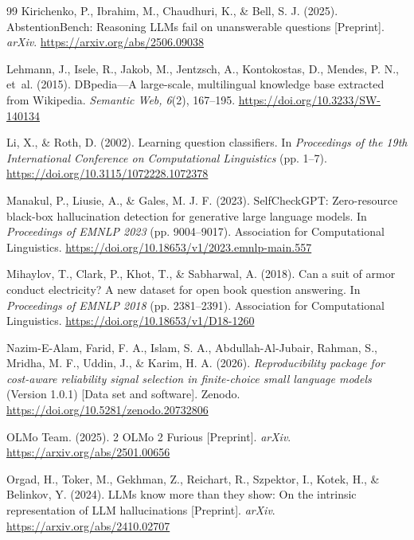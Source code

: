 \documentclass[preprint,12pt,authoryear]{elsarticle}
\begin{document}
\begin{thebibliography}{99}
Kirichenko, P., Ibrahim, M., Chaudhuri, K., \& Bell, S. J. (2025). AbstentionBench: Reasoning LLMs fail on unanswerable questions [Preprint]. \emph{arXiv}. \url{https://arxiv.org/abs/2506.09038}

Lehmann, J., Isele, R., Jakob, M., Jentzsch, A., Kontokostas, D., Mendes, P. N., et~al. (2015). DBpedia---A large-scale, multilingual knowledge base extracted from Wikipedia. \emph{Semantic Web, 6}(2), 167--195. \url{https://doi.org/10.3233/SW-140134}

Li, X., \& Roth, D. (2002). Learning question classifiers. In \emph{Proceedings of the 19th International Conference on Computational Linguistics} (pp. 1--7). \url{https://doi.org/10.3115/1072228.1072378}

Manakul, P., Liusie, A., \& Gales, M. J. F. (2023). SelfCheckGPT: Zero-resource black-box hallucination detection for generative large language models. In \emph{Proceedings of EMNLP 2023} (pp. 9004--9017). Association for Computational Linguistics. \url{https://doi.org/10.18653/v1/2023.emnlp-main.557}

Mihaylov, T., Clark, P., Khot, T., \& Sabharwal, A. (2018). Can a suit of armor conduct electricity? A new dataset for open book question answering. In \emph{Proceedings of EMNLP 2018} (pp. 2381--2391). Association for Computational Linguistics. \url{https://doi.org/10.18653/v1/D18-1260}

Nazim-E-Alam, Farid, F. A., Islam, S. A., Abdullah-Al-Jubair, Rahman, S., Mridha, M. F., Uddin, J., \& Karim, H. A. (2026). \emph{Reproducibility package for cost-aware reliability signal selection in finite-choice small language models} (Version 1.0.1) [Data set and software]. Zenodo. \url{https://doi.org/10.5281/zenodo.20732806}

OLMo Team. (2025). 2 OLMo 2 Furious [Preprint]. \emph{arXiv}. \url{https://arxiv.org/abs/2501.00656}

Orgad, H., Toker, M., Gekhman, Z., Reichart, R., Szpektor, I., Kotek, H., \& Belinkov, Y. (2024). LLMs know more than they show: On the intrinsic representation of LLM hallucinations [Preprint]. \emph{arXiv}. \url{https://arxiv.org/abs/2410.02707}


\end{thebibliography}
\end{document}

